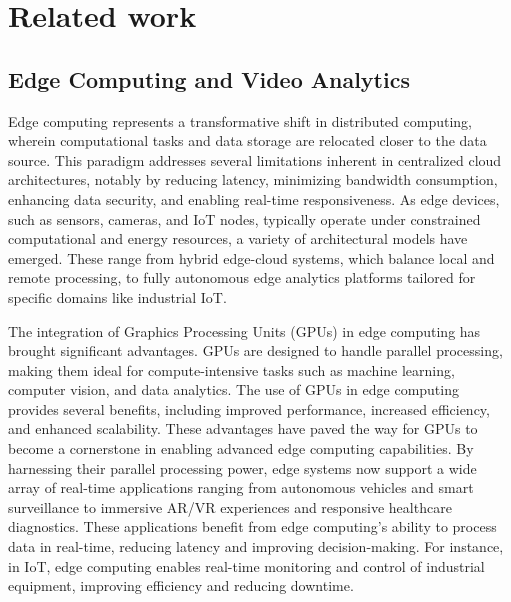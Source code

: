 \setchapterpreamble[u]{\margintoc}
\chapter{Related work}


\section{Edge Computing and Video Analytics}

Edge computing represents a transformative shift in distributed computing, wherein computational tasks and data storage are relocated closer to the data source. This paradigm addresses several limitations inherent in centralized cloud architectures, notably by reducing latency, minimizing bandwidth consumption, enhancing data security, and enabling real-time responsiveness. As edge devices, such as sensors, cameras, and IoT nodes, typically operate under constrained computational and energy resources, a variety of architectural models have emerged. These range from hybrid edge-cloud systems, which balance local and remote processing, to fully autonomous edge analytics platforms tailored for specific domains like industrial IoT.

The integration of Graphics Processing Units (GPUs) in edge computing has brought significant advantages. GPUs are designed to handle parallel processing, making them ideal for compute-intensive tasks such as machine learning, computer vision, and data analytics. The use of GPUs in edge computing provides several benefits, including improved performance, increased efficiency, and enhanced scalability. These advantages have paved the way for GPUs to become a cornerstone in enabling advanced edge computing capabilities. By harnessing their parallel processing power, edge systems now support a wide array of real-time applications ranging from autonomous vehicles and smart surveillance to immersive AR/VR experiences and responsive healthcare diagnostics. These applications benefit from edge computing's ability to process data in real-time, reducing latency and improving decision-making. For instance, in IoT, edge computing enables real-time monitoring and control of industrial equipment, improving efficiency and reducing downtime.


